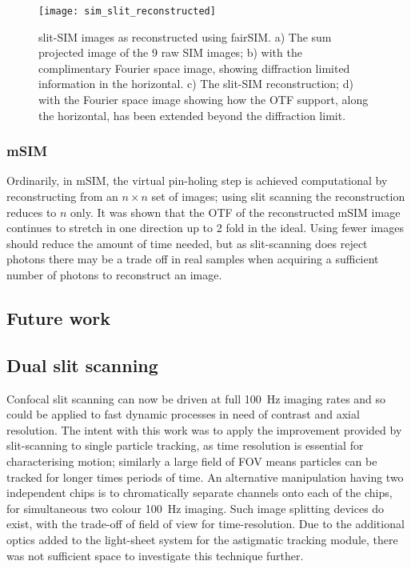 \begin{figure}
  \centering
  \texttt{[image: sim\_slit\_reconstructed]}
  \caption{slit-SIM images as reconstructed using fairSIM.
  a) The sum projected image of the 9 raw SIM images;
  b) with the complimentary Fourier space image, showing diffraction limited information in the horizontal.
  c) The slit-SIM reconstruction;
  d) with the Fourier space image showing how the OTF support, along the horizontal, has been extended beyond the diffraction limit.}
  \label{fig:sim_slit_reconstructed}
\end{figure}

\subsubsection{mSIM}

Ordinarily, in mSIM, the virtual pin-holing step is achieved computational by reconstructing from an $n\times n$ set of images; using slit scanning the reconstruction reduces to $n$ only.
It was shown that the OTF of the reconstructed mSIM image continues to stretch in one direction up to 2 fold in the ideal.
Using fewer images should reduce the amount of time needed, but as slit-scanning does reject photons there may be a trade off in real samples when acquiring a sufficient number of photons to reconstruct an image.

\subsection{Future work}

\subsection{Dual slit scanning}

Confocal slit scanning can now be driven at full \SI{100}{\hertz} imaging rates and so could be applied to fast dynamic processes in need of contrast and axial resolution.
The intent with this work was to apply the improvement provided by slit-scanning to single particle tracking, as time resolution is essential for characterising motion; similarly a large field of FOV means particles can be tracked for longer times periods of time.
An alternative manipulation having two independent chips is to chromatically separate channels onto each of the chips, for simultaneous two colour \SI{100}{\hertz} imaging.
Such image splitting devices do exist, with the trade-off of field of view for time-resolution.
Due to the additional optics added to the light-sheet system for the astigmatic tracking module, there was not sufficient space to investigate this technique further.

